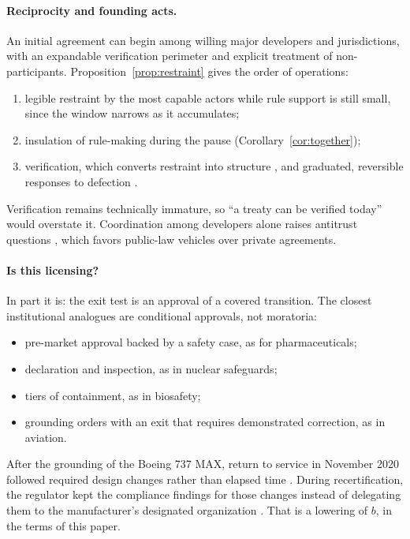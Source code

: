 \documentclass[11pt]{article}
\theoremstyle{plain}
\theoremstyle{definition}
\begin{document}
\paragraph{Reciprocity and founding acts.} An initial agreement can begin among willing major developers and jurisdictions, with an expandable verification perimeter and explicit treatment of non-participants. Proposition~\ref{prop:restraint} gives the order of operations:
\begin{enumerate}[leftmargin=*]
\item legible restraint by the most capable actors while rule support is still small, since the window narrows as it accumulates;
\item insulation of rule-making during the pause (Corollary~\ref{cor:together});
\item verification, which converts restraint into structure \citep{shavit2023,wasil2024,baker2025}, and graduated, reversible responses to defection \citep{axelrod1984,ostrom1990}.
\end{enumerate}
Verification remains technically immature, so ``a treaty can be verified today'' would overstate it. Coordination among developers alone raises antitrust questions \citep{alaga2023}, which favors public-law vehicles over private agreements.

\paragraph{Is this licensing?} In part it is: the exit test is an approval of a covered transition. The closest institutional analogues are conditional approvals, not moratoria:
\begin{itemize}[leftmargin=*]
\item pre-market approval backed by a safety case, as for pharmaceuticals;
\item declaration and inspection, as in nuclear safeguards;
\item tiers of containment, as in biosafety;
\item grounding orders with an exit that requires demonstrated correction, as in aviation.
\end{itemize}
After the grounding of the Boeing 737 MAX, return to service in November 2020 followed required design changes rather than elapsed time \citep{faa2020}. During recertification, the regulator kept the compliance findings for those changes instead of delegating them to the manufacturer's designated organization \citep{dotoig2023}. That is a lowering of $b$, in the terms of this paper.
\end{document}
